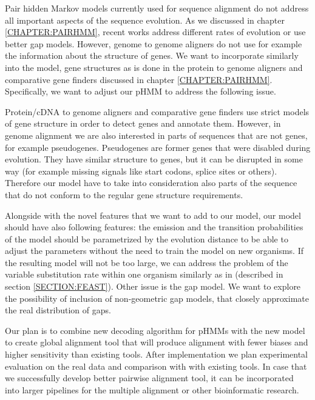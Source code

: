Pair hidden Markov models currently used for sequence alignment do not address
all important aspects of the sequence evolution. As we discussed in chapter
\ref{CHAPTER:PAIRHMM}, recent works address different rates of evolution or use
better gap models. However, genome to genome aligners do not use for example the
information about the structure of genes. We want to incorporate similarly into
the model, gene structures as is done in the protein to genome aligners and
comparative gene finders discussed in chapter \ref{CHAPTER:PAIRHMM}.
Specifically, we want to adjust our pHMM to  address the following issue. 

Protein/cDNA to genome aligners and comparative gene
finders use strict models of  gene structure in order to detect genes and
annotate them.  However, in genome alignment we are also interested in parts of
sequences that are not genes, for example pseudogenes. Pseudogenes are former
genes that were disabled during evolution. They have similar structure to genes,
but it can be disrupted in some way (for example missing signals
like start codons, splice sites or others). Therefore our model have to take
into consideration also parts of the sequence that do not conform to the regular gene
structure requirements.

Alongside with the novel features that we want to add to our model, our model
should have also following features: the emission and the transition
probabilities of the model should be parametrized by the evolution distance to
be able to adjust the parameters without the need to train the model on new
organisms. If the resulting model will not be too large, we can address the
problem of the variable substitution rate within one organism similarly as in
\cite{Hudek2010} (described in section \ref{SECTION:FEAST}). Other issue is the
gap model. We want to explore the possibility of inclusion of non-geometric gap
models, that closely approximate the real distribution of gaps. 

Our plan is to combine new decoding algorithm for pHMMs with the new model to
create global alignment tool that will produce alignment with fewer biases and
higher sensitivity than existing tools. After implementation we plan
experimental evaluation on the real data and comparison with with existing
tools. In case that we successfully develop better pairwise alignment tool, it
can be incorporated into larger pipelines for the multiple alignment or other
bioinformatic research. 


\label{LastPage}

